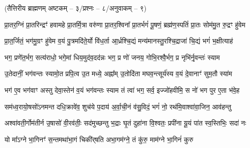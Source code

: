 

\vspace{-1ex}
\centerline{\normalsize(तैत्तिरीय ब्राह्मणम् अष्टकम् – ३/प्रश्नः – ८/अनुवाकम् – ९)}


\twolineshloka
{प्रा॒तर॒ग्निं प्रा॒तरिन्द्रꣳ॑ हवामहे प्रा॒तर्मि॒त्रा वरु॑णा प्रा॒तर॒श्विना᳚}
{प्रा॒तर्भगं॑ पू॒षणं॒ ब्रह्म॑ण॒स्पतिं॑ प्रा॒तः सोम॑मु॒त रु॒द्रꣳ हु॑वेम}

\twolineshloka
{प्रा॒त॒र्जितं॒ भग॑मु॒ग्रꣳ हु॑वेम व॒यं पु॒त्रमदि॑ते॒र्यो वि॑ध॒र्ता}
{आ॒र्ध्रश्चि॒द्यं मन्य॑मानस्तु॒रश्चि॒द्राजा॑ चि॒द्यं भगं॑ भ॒क्षीत्याह॑}

\twolineshloka
{भग॒ प्रणे॑त॒र्भग॒ सत्य॑राधो॒ भगे॒मां धिय॒मुद॑व॒दद॑न्नः}
{भग॒ प्र णो॑ जनय॒ गोभि॒रश्वै॒र्भग॒ प्र नृभि॑र्नृ॒वन्तः॑ स्याम}

\twolineshloka
{उ॒तेदानीं॒ भग॑वन्तः स्यामो॒त प्रपि॒त्व उ॒त मध्ये॒ अह्ना᳚म्}
{उ॒तोदि॑ता मघव॒न्त्सूर्य॑स्य व॒यं दे॒वानाꣳ॑ सुम॒तौ स्या॑म}

\twolineshloka
{भग॑ ए॒व भग॑वाꣳ अस्तु देवा॒स्तेन॑ व॒यं भग॑वन्तः स्याम}
{तं त्वा॑ भग॒ सर्व॒ इज्जो॑हवीमि॒ स नो॑ भग पुर ए॒ता भ॑वे॒ह}

\twolineshloka
{सम॑ध्व॒रायो॒षसो॑ऽनमन्त दधि॒क्रावे॑व॒ शुच॑ये प॒दाय॑}
{अ॒र्वा॒ची॒नं व॑सु॒विदं॒ भगं॑ नो॒ रथ॑मि॒वाश्वा॑वा॒जिन॒ आव॑हन्तु}

\twolineshloka
{अश्वा॑वती॒र्गोम॑तीर्न उ॒षासो॑ वी॒रव॑तीः॒ सद॑मुच्छन्तु भ॒द्राः}
{घृ॒तं दुहा॑ना वि॒श्वतः॒ प्रपी॑ना यू॒यं पा॑त स्व॒स्तिभिः॒ सदा॑ नः}

\twolineshloka
{यो मा᳚ऽग्ने भा॒गिनꣳ॑ स॒न्तमथा॑भा॒गं चिकी॑र्‌षति}
{अभा॒गम॑ग्ने॒ तं कु॑रु॒ माम॑ग्ने भा॒गिनं॑ कुरु}

